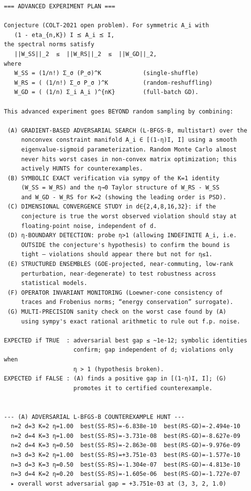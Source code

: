 \documentclass[11pt]{article}
\begin{document}
\begin{lstlisting}
=== ADVANCED EXPERIMENT PLAN ===

Conjecture (COLT-2021 open problem). For symmetric A_i with
   (1 - eta_{n,K}) I ⪯ A_i ⪯ I,
the spectral norms satisfy
   ||W_SS||_2  ≤  ||W_RS||_2  ≤  ||W_GD||_2,
where
   W_SS = (1/n!) Σ_σ (P_σ)^K            (single-shuffle)
   W_RS = ( (1/n!) Σ_σ P_σ )^K          (random-reshuffling)
   W_GD = ( (1/n) Σ_i A_i )^{nK}        (full-batch GD).

This advanced experiment goes BEYOND random sampling by combining:

 (A) GRADIENT-BASED ADVERSARIAL SEARCH (L-BFGS-B, multistart) over the
     nonconvex constraint manifold A_i ∈ [(1-η)I, I] using a smooth
     eigenvalue-sigmoid parameterization. Random Monte Carlo almost
     never hits worst cases in non-convex matrix optimization; this
     actively HUNTS for counterexamples.
 (B) SYMBOLIC EXACT verification via sympy of the K=1 identity
     (W_SS = W_RS) and the η→0 Taylor structure of W_RS - W_SS
     and W_GD - W_RS for K=2 (showing the leading order is PSD).
 (C) DIMENSIONAL CONVERGENCE STUDY in d∈{2,4,8,16,32}: if the
     conjecture is true the worst observed violation should stay at
     floating-point noise, independent of d.
 (D) η-BOUNDARY DETECTION: probe η>1 (allowing INDEFINITE A_i, i.e.
     OUTSIDE the conjecture's hypothesis) to confirm the bound is
     tight – violations should appear there but not for η≤1.
 (E) STRUCTURED ENSEMBLES (GOE-projected, near-commuting, low-rank
     perturbation, near-degenerate) to test robustness across
     statistical models.
 (F) OPERATOR INVARIANT MONITORING (Loewner-cone consistency of
     traces and Frobenius norms; “energy conservation” surrogate).
 (G) MULTI-PRECISION sanity check on the worst case found by (A)
     using sympy's exact rational arithmetic to rule out f.p. noise.

EXPECTED if TRUE  : adversarial best gap ≤ ~1e-12; symbolic identities
                    confirm; gap independent of d; violations only when
                    η > 1 (hypothesis broken).
EXPECTED if FALSE : (A) finds a positive gap in [(1-η)I, I]; (G)
                    promotes it to certified counterexample.


--- (A) ADVERSARIAL L-BFGS-B COUNTEREXAMPLE HUNT ---
  n=2 d=3 K=2 η=1.00  best(SS-RS)=-6.838e-10  best(RS-GD)=-2.494e-10
  n=2 d=4 K=3 η=1.00  best(SS-RS)=-3.731e-08  best(RS-GD)=-8.627e-09
  n=2 d=4 K=3 η=0.50  best(SS-RS)=-2.863e-08  best(RS-GD)=-9.976e-09
  n=3 d=3 K=2 η=1.00  best(SS-RS)=+3.751e-03  best(RS-GD)=-1.577e-10
  n=3 d=3 K=3 η=0.50  best(SS-RS)=-1.304e-07  best(RS-GD)=-4.813e-10
  n=3 d=4 K=2 η=0.20  best(SS-RS)=-1.605e-06  best(RS-GD)=-1.727e-07
  ▸ overall worst adversarial gap = +3.751e-03 at (3, 3, 2, 1.0)


\end{lstlisting}
\end{document}
